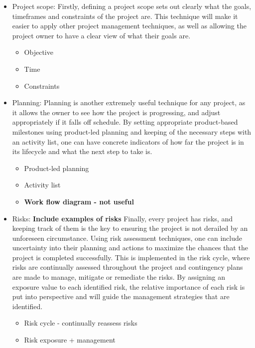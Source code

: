 \documentclass[11pt]{article}
\begin{document}
\begin{itemize}

    \item Project scope:
    Firstly, defining a project scope sets out clearly what the goals, timeframes and constraints of the project are. This technique will make it easier to apply other project management techniques, as well as allowing the project owner to have a clear view of what their goals are.
    \begin{itemize}
        \item Objective
        \item Time
        \item Constraints
    \end{itemize}

    \item Planning:
    Planning is another extremely useful technique for any project, as it allows the owner to see how the project is progressing, and adjust appropriately if it falls off schedule.
    By setting appropriate product-based milestones using product-led planning and keeping of the necessary steps with an activity list, one can have concrete indicators of how far the project is in its lifecycle and what the next step to take is.
    \begin{itemize}
        \item Product-led planning
        \item Activity list
        \item \textbf{Work flow diagram - not useful}
    \end{itemize}

    \item Risks: \textbf{Include examples of risks}
    Finally, every project has risks, and keeping track of them is the key to ensuring the project is not derailed by an unforeseen circumstance. Using risk assessment techniques, one can include uncertainty into their planning and actions to maximize the chances that the project is completed successfully.
    This is implemented in the risk cycle, where risks are continually assessed throughout the project and contingency plans are made to manage, mitigate or remediate the risks. By assigning an exposure value to each identified risk, the relative importance of each risk is put into perspective and will guide the management strategies that are identified.
    \begin{itemize}
        \item Risk cycle \-- continually reassess risks
        \item Risk exposure + management
    \end{itemize}



\end{itemize}
\end{document}
